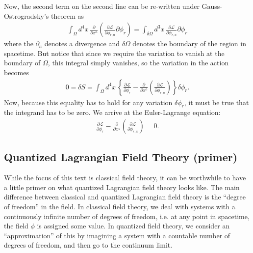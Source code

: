 \documentclass[a4paper,11pt]{article}
\numberwithin{equation}{section}
\theoremstyle{definition}
\newcommand{\p}{\partial}
\newcommand{\lag}{\mathcal{L}}
\begin{document}
Now, the second term on the second line can be re-written under Gauss-Ostrogradsky's theorem as
\begin{align}
\int_\Omega d^4x\,\frac{\p}{\p x^a}\left(\frac{\p\lag}{\p\phi_{r,a}}\p \phi_r \right) = 
\int_{\delta \Omega}d^3x\,  \frac{\p\lag}{\p\phi_{r,a}}\p \phi_r
\end{align}
where the $\p_a$ denotes a divergence and $\delta \Omega$ denotes the boundary of the region in spacetime. But notice that since we require the variation to vanish at the boundary of $\Omega$, this integral simply vanishes, so the variation in the action becomes
\begin{align}
0 = \delta S = \int_\Omega d^4x\, \left\{ \frac{\p\lag}{\p\phi_r} - \frac{\p}{\p x^a}\left( \frac{\p\lag}{\p\phi_{r,a}} \right) \right\}\delta \phi_r.
\end{align}
Now, because this equality has to hold for any variation $\delta \phi_r$, it must be true that the integrand has to be zero. We arrive at the Euler-Lagrange equation:
\begin{align}
\frac{\p\lag}{\p\phi_r} - \frac{\p}{\p x^a}\left( \frac{\p\lag}{\p\phi_{r,a}} \right) = 0.
\end{align}

\subsection{Quantized Lagrangian Field Theory (primer)}
While the focus of this text is classical field theory, it can be worthwhile to have a little primer on what quantized Lagrangian field theory looks like. The main difference between classical and quantized Lagrangian field theory is the ``degree of freedom'' in the field. In classical field theory, we deal with systems with a continuously infinite number of degrees of freedom, i.e. at any point in spacetime, the field $\phi$ is assigned some value. In quantized field theory, we consider an ``approximation'' of this by imagining a system with a countable number of degrees of freedom, and then go to the continuum limit.\\
\end{document}
